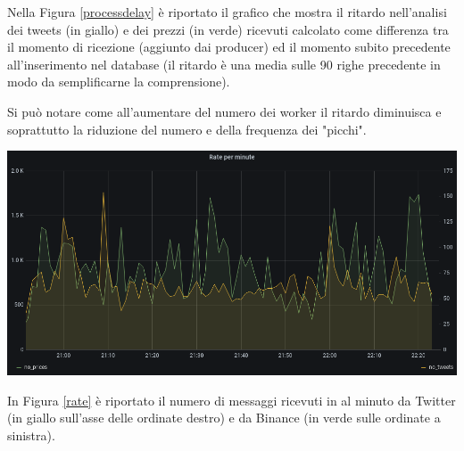Nella Figura \ref{processdelay} è riportato il grafico che mostra il ritardo nell'analisi dei tweets
(in giallo) e dei prezzi (in verde) ricevuti calcolato come differenza tra il momento di ricezione
(aggiunto dai producer) ed il momento subito precedente all'inserimento nel database (il ritardo è
una media sulle 90 righe precedente in modo da semplificarne la comprensione).

Si può notare come all'aumentare del numero dei worker il ritardo diminuisca e soprattutto la
riduzione del numero e della frequenza dei "picchi".

\begin{center}
    \includegraphics[max width=\linewidth]{rate.png}
    \label{rate}
\end{center}

In Figura \ref{rate} è riportato il numero di messaggi ricevuti in al minuto da Twitter (in giallo
sull'asse delle ordinate destro) e da Binance (in verde sulle ordinate a sinistra).

